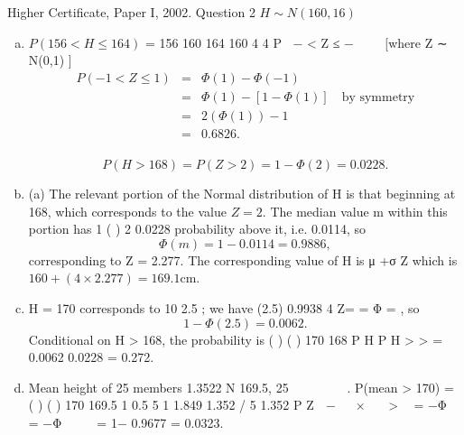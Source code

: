 \documentclass[a4paper,12pt]{article}
\begin{document}
Higher Certificate, Paper I, 2002. Question 2
$H \sim N(160,16)$
\begin{enumerate}[(a)]
\item  $P(156 < H \leq 164)$ = 156 160 164 160
4 4
P − < Z ≤ − 
 
[where Z ∼ N(0,1) ]
\begin{eqnarray*} 
P(−1< Z \leq 1) &=& \Phi(1) -\Phi(-1) \\&=& \Phi(1) -[1-\Phi(1)] \quad \mbox{by symmetry}\\
&=& 2(\Phi(1)) -1\\
&=& 0.6826.\\
\end{eqnarray*}

\[P(H >168) = P(Z > 2) =1-\Phi(2) = 0.0228 .\]
\item  (a) The relevant portion of the Normal distribution of H is that beginning
at 168, which corresponds to the value $Z = 2$. The median value m within this
portion has 1 ( )
2 0.0228 probability above it, i.e. 0.0114, so \[\Phi(m) =
1 − 0.0114 = 0.9886,\] corresponding to Z = 2.277. The corresponding value of
H is μ +σ Z which is $160 + (4 \times 2.277) = 169.1 \mbox{cm}$.
\item H = 170 corresponds to 10 2.5 ; we have (2.5) 0.9938
4
Z= = Φ = , so
\[1−\Phi(2.5) = 0.0062 . \]Conditional on H > 168, the probability is ( )
( )
170
168
P H
P H
>
>
= 0.0062
0.0228
= 0.272.
\item Mean height of 25 members
1.3522 N 169.5,
25
 
∼  
 
.
P(mean > 170) = ( ) ( ) 170 169.5 1 0.5 5 1 1.849
1.352 / 5 1.352
P Z
 −   ×   >  = −Φ  = −Φ    
= 1− 0.9677 = 0.0323.
\end{enumerate}
\end{document}
